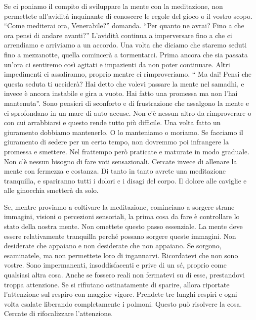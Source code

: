 Se ci poniamo il compito di sviluppare la mente con la meditazione, non
permettete all'avidità inquinante di conoscere le regole del gioco o il
vostro scopo. ``Come mediterai ora, Venerabile?'' domanda. ``Per quanto
ne avrai? Fino a che ora pensi di andare avanti?'' L'avidità continua a
imperversare fino a che ci arrendiamo e arriviamo a un accordo. Una
volta che diciamo che staremo seduti fino a mezzanotte, quella comincerà
a tormentarci. Prima ancora che sia passata un'ora ci sentiremo così
agitati e impazienti da non poter continuare. Altri impedimenti ci
assaliranno, proprio mentre ci rimproveriamo. `` Ma dai! Pensi che
questa seduta ti ucciderà? Hai detto che volevi passare la mente nel
samadhi, e invece è ancora instabile e gira a vuoto. Hai fatto una
promessa ma non l'hai mantenuta''. Sono pensieri di sconforto e di
frustrazione che assalgono la mente e ci sprofondano in un mare di
auto-accuse. Non c'è nessun altro da rimproverare o con cui arrabbiarsi
e questo rende tutto più difficile. Una volta fatto un giuramento
dobbiamo mantenerlo. O lo manteniamo o moriamo. Se facciamo il
giuramento di sedere per un certo tempo, non dovremmo poi infrangere la
promessa e smettere. Nel frattempo però praticate e maturate in modo
graduale. Non c'è nessun bisogno di fare voti sensazionali. Cercate
invece di allenare la mente con fermezza e costanza. Di tanto in tanto
avrete una meditazione tranquilla, e spariranno tutti i dolori e i
disagi del corpo. Il dolore alle caviglie e alle ginocchia smetterà da
solo.

Se, mentre proviamo a coltivare la meditazione, cominciano a sorgere
strane immagini, visioni o percezioni sensoriali, la prima cosa da fare
è controllare lo stato della nostra mente. Non omettete questo passo
essenziale. La mente deve essere relativamente tranquilla perché possano
sorgere queste immagini. Non desiderate che appaiano e non desiderate
che non appaiano. Se sorgono, esaminatele, ma non permettete loro di
ingannarvi. Ricordatevi che non sono vostre. Sono impermanenti,
insoddisfacenti e prive di un sé, proprio come qualsiasi altra cosa.
Anche se fossero reali non fermatevi su di esse, prestandovi troppa
attenzione. Se si rifiutano ostinatamente di sparire, allora riportate
l'attenzione sul respiro con maggior vigore. Prendete tre lunghi respiri
e ogni volta esalate liberando completamente i polmoni. Questo può
risolvere la cosa. Cercate di rifocalizzare l'attenzione.

